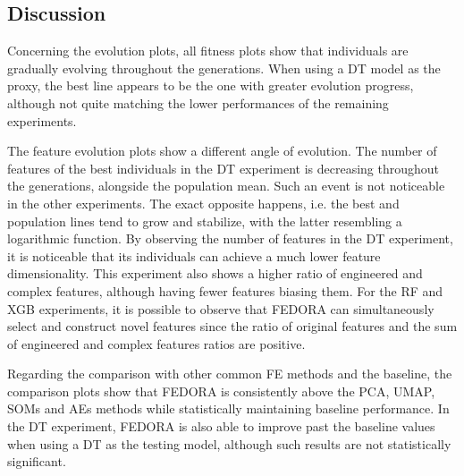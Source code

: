 \subsection{Discussion}
Concerning the evolution plots, all fitness plots show that individuals are gradually evolving throughout the generations. When using a \gls{DT} model as the proxy, the best line appears to be the one with greater evolution progress, although not quite matching the lower performances of the remaining experiments.

The feature evolution plots show a different angle of evolution. The number of features of the best individuals in the \gls{DT} experiment is decreasing throughout the generations, alongside the population mean. Such an event is not noticeable in the other experiments. The exact opposite happens, i.e. the best and population lines tend to grow and stabilize, with the latter resembling a logarithmic function. By observing the number of features in the \gls{DT} experiment, it is noticeable that its individuals can achieve a much lower feature dimensionality. This experiment also shows a higher ratio of engineered and complex features, although having fewer features biasing them. For the \gls{RF} and \gls{XGB} experiments, it is possible to observe that FEDORA can simultaneously select and construct novel features since the ratio of original features and the sum of engineered and complex features ratios are positive. 

Regarding the comparison with other common \gls{FE} methods and the baseline, the comparison plots show that FEDORA is consistently above the \gls{PCA}, \gls{UMAP}, \glspl{SOM} and \glspl{AE} methods while statistically maintaining baseline performance. In the \gls{DT} experiment, FEDORA is also able to improve past the baseline values when using a \gls{DT} as the testing model, although such results are not statistically significant.

